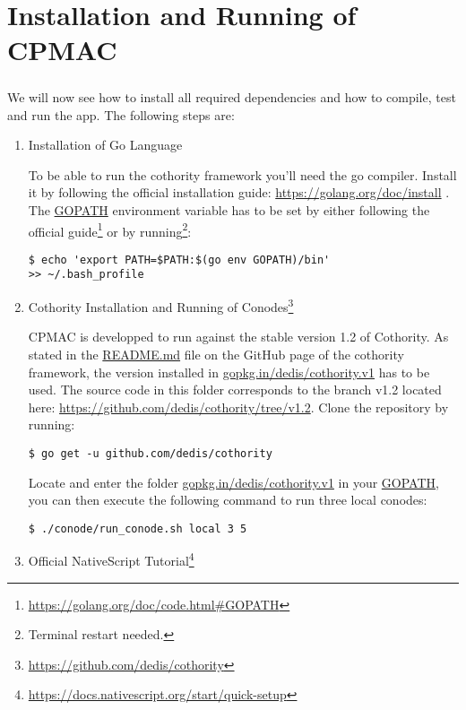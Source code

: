 \chapter{Installation and Running of CPMAC}

\paragraph{}
We will now see how to install all required dependencies and how to compile, test and run the app. The following steps are:

\begin{enumerate}
\item Installation of Go Language

To be able to run the cothority framework you'll need the go compiler. Install it by following the official installation guide: \url{https://golang.org/doc/install} . The \url{GOPATH} environment variable has to be set by either following the official guide\footnote{\url{https://golang.org/doc/code.html#GOPATH}} or by running\footnote{Terminal restart needed.}:
\begin{lstlisting}
$ echo 'export PATH=$PATH:$(go env GOPATH)/bin'
>> ~/.bash_profile
\end{lstlisting}

\item Cothority Installation and Running of Conodes\footnote{\url{https://github.com/dedis/cothority}}

CPMAC is developped to run against the stable version 1.2 of Cothority. As stated in the \url{README.md} file on the GitHub page of the cothority framework, the version installed in \url{gopkg.in/dedis/cothority.v1} has to be used. The source code in this folder corresponds to the branch v1.2 located here: \url{https://github.com/dedis/cothority/tree/v1.2}. Clone the repository by running:
\begin{lstlisting}
$ go get -u github.com/dedis/cothority
\end{lstlisting}
Locate and enter the folder \url{gopkg.in/dedis/cothority.v1} in your \url{GOPATH}, you can then execute the following command to run three local conodes:
\begin{lstlisting}
$ ./conode/run_conode.sh local 3 5
\end{lstlisting}

\item Official NativeScript Tutorial\footnote{\url{https://docs.nativescript.org/start/quick-setup}}


\end{enumerate}
